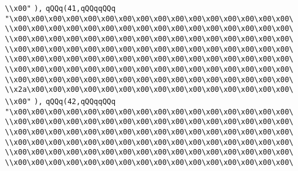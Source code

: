 \verb|\\x00"|\newline
\verb|),|\newline
\verb|qQQq(41,qQQqqQQq|\newline
\verb|"\x00\x00\x00\x00\x00\x00\x00\x00\x00\x00\x00\x00\x00\x00\x00\x00\|\newline
\verb|\\x00\x00\x00\x00\x00\x00\x00\x00\x00\x00\x00\x00\x00\x00\x00\x00\|\newline
\verb|\\x00\x00\x00\x00\x00\x00\x00\x00\x00\x00\x00\x00\x00\x00\x00\x00\|\newline
\verb|\\x00\x00\x00\x00\x00\x00\x00\x00\x00\x00\x00\x00\x00\x00\x00\x00\|\newline
\verb|\\x00\x00\x00\x00\x00\x00\x00\x00\x00\x00\x00\x00\x00\x00\x00\x00\|\newline
\verb|\\x00\x00\x00\x00\x00\x00\x00\x00\x00\x00\x00\x00\x00\x00\x00\x00\|\newline
\verb|\\x00\x00\x00\x00\x00\x00\x00\x00\x00\x00\x00\x00\x00\x00\x00\x00\|\newline
\verb|\\x2a\x00\x00\x00\x00\x00\x00\x00\x00\x00\x00\x00\x00\x00\x00\x00\|\newline
\verb|\\x00"|\newline
\verb|),|\newline
\verb|qQQq(42,qQQqqQQq|\newline
\verb|"\x00\x00\x00\x00\x00\x00\x00\x00\x00\x00\x00\x00\x00\x00\x00\x00\|\newline
\verb|\\x00\x00\x00\x00\x00\x00\x00\x00\x00\x00\x00\x00\x00\x00\x00\x00\|\newline
\verb|\\x00\x00\x00\x00\x00\x00\x00\x00\x00\x00\x00\x00\x00\x00\x00\x00\|\newline
\verb|\\x00\x00\x00\x00\x00\x00\x00\x00\x00\x00\x00\x00\x00\x00\x00\x00\|\newline
\verb|\\x00\x00\x00\x00\x00\x00\x00\x00\x00\x00\x00\x00\x00\x00\x00\x00\|\newline
\verb|\\x00\x00\x00\x00\x00\x00\x00\x00\x00\x00\x00\x00\x00\x00\x00\x00\|\newline
